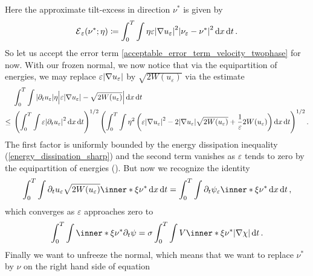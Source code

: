 Here the approximate tilt-excess in direction $ \nu^{ \ast } $ is given by
\begin{equation*}
	\tilt_excess_{ \varepsilon } ( \nu^{ \ast } ; \eta )
	\coloneqq
	\int_{ 0 }^{ T }
	\int
	\eta
	\varepsilon 
	\abs{ \nabla u_{ \varepsilon } }^{ 2 }
	\abs{ \nu_{ \varepsilon } - \nu^{ \ast } }^{ 2 }
	\dd{ x }
	\dd{ t }.
\end{equation*}
So let us accept the error term \ref{acceptable_error_term_velocity_twophase} 
for now.
With our frozen normal, we now notice that via the equipartition of energies, 
we may replace $ \varepsilon \abs{ \nabla u_{ \varepsilon } } $ by $ \sqrt{ 2 W 
( u_{ \varepsilon } ) } $ via the estimate
\begin{align*}
	& 
	\int_{ 0 }^{ T }
	\int
	\abs{ \partial_{ t } u_{ \varepsilon } } \eta
	\abs{ \varepsilon \abs{ \nabla u_{ \varepsilon } } - \sqrt{ 2 W ( u_{ 
	\varepsilon } ) } }
	\dd{ x }
	\dd{ t }
	\\
	\leq{} &
	\left(
	\int_{ 0 }^{ T }
	\int
	\varepsilon 
	\abs{ \partial_{ t } u_{ \varepsilon } }^{ 2 }
	\dd{ x }
	\dd{ t }
	\right)^{ 1/2 }
	\left(
	\int_{ 0 }^{ T }
	\int
	\eta^{ 2 }
	\left(
	\varepsilon \abs{ \nabla u_{ \varepsilon } }^{ 2 }
	-
	2 \abs{ \nabla u_{ \varepsilon } } \sqrt{ 2 W ( u_{ \varepsilon } ) }
	+
	\frac{ 1 }{ \varepsilon }
	2 W ( u_{ \varepsilon } ) 
	\right)
	\dd{ x }
	\dd{ t }
	\right)^{ 1 / 2 }.
\end{align*}
The first factor is uniformly bounded by the energy dissipation inequality 
(\ref{energy_dissipation_sharp}) and the second term vanishes as $ \varepsilon 
$ tends to zero by the equipartition of energies 
().
But now we recognize the identity
\begin{equation*}
	\int_{ 0 }^{ T }
	\int
	\partial_{ t } u_{ \varepsilon }
	\sqrt{ 2 W ( u_{ \varepsilon } ) }
	\inner*{ \xi }{ \nu^{ \ast } }
	\dd{ x }
	\dd{ t }
	=
	\int_{ 0 }^{ T }
	\int
	\partial_{ t } \psi_{ \varepsilon }
	\inner*{ \xi }{ \nu^{ \ast } }
	\dd{ x }
	\dd{ t },
\end{equation*}
which converges as $ \varepsilon $ approaches zero to 
\begin{equation}
	\label{rewriting_limit_of_frozen_velocity_term}
	\int_{ 0 }^{ T }
	\int
	\inner*{ \xi }{ \nu^{ \ast } }
	\partial_{ t } \psi
	=
	\sigma
	\int_{ 0 }^{ T }
	\int
	V \inner*{ \xi }{ \nu^{ \ast } }
	\abs{ \nabla \chi }
	\dd{ t }.
\end{equation}
Finally we want to unfreeze the normal, which means that we want to replace $ 
\nu^{ \ast } $ by $ \nu $ on the right hand side of equation 
